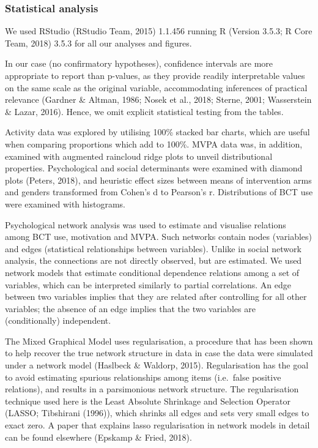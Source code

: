 \documentclass[british,man]{apa6}
\begin{document}
\hypertarget{statistical-analysis}{%
\subsubsection{Statistical analysis}\label{statistical-analysis}}

We used RStudio (RStudio Team, 2015) 1.1.456 running R (Version 3.5.3; R Core Team, 2018) 3.5.3 for all our analyses and figures.

In our case (no confirmatory hypotheses), confidence intervals are more appropriate to report than p-values, as they provide readily interpretable values on the same scale as the original variable, accommodating inferences of practical relevance (Gardner \& Altman, 1986; Nosek et al., 2018; Sterne, 2001; Wasserstein \& Lazar, 2016). Hence, we omit explicit statistical testing from the tables.

Activity data was explored by utilising 100\% stacked bar charts, which are useful when comparing proportions which add to 100\%. MVPA data was, in addition, examined with augmented raincloud ridge plots to unveil distributional properties. Psychological and social determinants were examined with diamond plots (Peters, 2018), and heuristic effect sizes between means of intervention arms and genders transformed from Cohen's d to Pearson's r. Distributions of BCT use were examined with histograms.

Psychological network analysis was used to estimate and visualise relations among BCT use, motivation and MVPA. Such networks contain nodes (variables) and edges (statistical relationships between variables). Unlike in social network analysis, the connections are not directly observed, but are estimated. We used network models that estimate conditional dependence relations among a set of variables, which can be interpreted similarly to partial correlations. An edge between two variables implies that they are related after controlling for all other variables; the absence of an edge implies that the two variables are (conditionally) independent.

The Mixed Graphical Model uses regularisation, a procedure that has been shown to help recover the true network structure in data in case the data were simulated under a network model (Haslbeck \& Waldorp, 2015). Regularisation has the goal to avoid estimating spurious relationships among items (i.e.~false positive relations), and results in a parsimonious network structure. The regularisation technique used here is the Least Absolute Shrinkage and Selection Operator (LASSO; Tibshirani (1996)), which shrinks all edges and sets very small edges to exact zero. A paper that explains lasso regularisation in network models in detail can be found elsewhere (Epskamp \& Fried, 2018).
\end{document}

